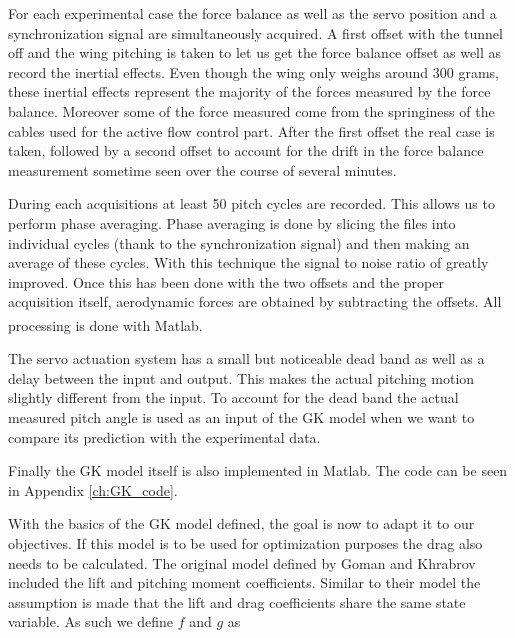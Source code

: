\par For each experimental case the force balance as well as the servo position and a synchronization signal are simultaneously acquired.
A first offset with the tunnel off and the wing pitching is taken to let us get the force balance offset as well as record the inertial effects.
Even though the wing only weighs around 300 grams, these inertial effects represent the majority of the forces measured by the force balance.
Moreover some of the force measured come from the springiness of the cables used for the active flow control part.
After the first offset the real case is taken, followed by a second offset to account for the drift in the force balance measurement sometime seen over the course of several minutes.

\par During each acquisitions at least 50 pitch cycles are recorded.
This allows us to perform phase averaging.
Phase averaging is done by slicing the files into individual cycles (thank to the synchronization signal) and then making an average of these cycles.
With this technique the signal to noise ratio of greatly improved.
Once this has been done with the two offsets and the proper acquisition itself, aerodynamic forces are obtained by subtracting the offsets.
All processing is done with Matlab\textsuperscript{\textregistered}. 

\par The servo actuation system has a small but noticeable dead band as well as a delay between the input and output.
This makes the actual pitching motion slightly different from the input.
To account for the dead band the actual measured pitch angle is used as an input of the GK model when we want to compare its prediction with the experimental data.

\par Finally the GK model itself is also implemented in Matlab.
The code can be seen in Appendix \ref{ch:GK_code}.



\FloatBarrier



With the basics of the GK model defined, the goal is now to adapt it to our objectives.
If this model is to be used for optimization purposes the drag also needs to be calculated.
The original model defined by Goman and Khrabrov included the lift and pitching moment coefficients.
Similar to their model the assumption is made that the lift and drag coefficients share the same state variable.
As such we define $f$ and $g$ as

